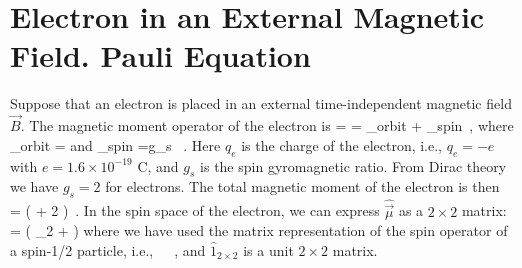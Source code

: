 \section{Electron in an External Magnetic Field. Pauli Equation}
Suppose that an electron is placed in an external time-independent magnetic field $\vec{B}$. The magnetic moment operator of the
electron is 
\be
\hat{\vec{\mu}} =  = \hat{\vec{\mu}}_{{\rm orbit}} + \hat{\vec{\mu}}_{{\rm spin}}\, ,
\ee
where
\be
\hat{\vec{\mu}}_{{\rm orbit}} =   
\ee
and
\be
\hat{\vec{\mu}}_{{\rm spin}} =g_s  \, .
\ee
Here $q_e$ is the charge of the electron, i.e., $q_e=-e$ with $e=1.6 \times 10^{-19}$ C, and $g_s$ is the spin
gyromagnetic ratio. From Dirac theory we have $g_s=2$ for electrons. The total magnetic moment of the electron is then
\be
\hat{\vec{\mu}} =  ( + 2  )\, .
\ee 
In the spin space of the electron, we can express $\hat{\vec{\mu}}$ as a $2\times 2$ matrix:
\be
\hat{\vec{\mu}} =  (\; _{2} + \hbar \vec{\sigma} )
\ee
where we have used the matrix representation of the spin operator of a spin-1/2 particle, i.e.,
\be
{}  \,\hbar\, \vec{\sigma}\, ,
\ee
and $\hat{1}_{2\times 2}$ is a unit $2\times 2$ matrix.

